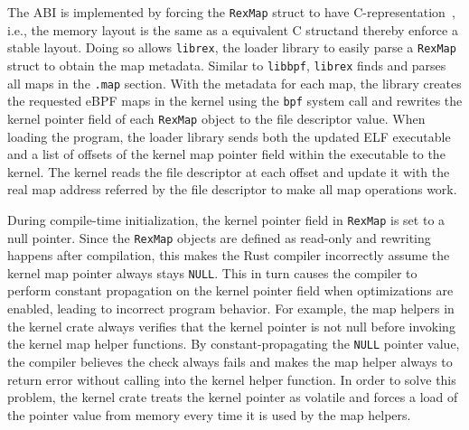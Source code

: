 The ABI is implemented by forcing the \texttt{RexMap} struct to have
    C-representation~\cite{nomicon-reprc}, i.e., the memory layout
    is the same as a equivalent C structand thereby enforce a stable layout.
Doing so allows \texttt{librex}, the \projname{} loader library to easily parse
    a \texttt{RexMap} struct to obtain the map metadata.
Similar to \texttt{libbpf}, \texttt{librex} finds and parses all maps in the
    \texttt{.map} section.
With the metadata for each map, the library creates the requested eBPF maps in
    the kernel using the \texttt{bpf} system call and rewrites the kernel
    pointer field of each \texttt{RexMap} object to the file descriptor value.
When loading the program, the loader library sends both the updated ELF
    executable and a list of offsets of the kernel map pointer field within the
    executable to the kernel.
The kernel reads the file descriptor at each offset and update it with the real
    map address referred by the file descriptor to make all map operations
    work.

During compile-time initialization, the kernel pointer field in
    \texttt{RexMap} is set to a null pointer.
Since the \texttt{RexMap} objects are defined as read-only and rewriting
    happens after compilation, this makes the Rust compiler incorrectly assume
    the kernel map pointer always stays \texttt{NULL}.
This in turn causes the compiler to perform constant propagation on the kernel
    pointer field when optimizations are enabled, leading to incorrect program
    behavior.
For example, the \projname{} map helpers in the \projname{} kernel crate always
    verifies that the kernel pointer is not null before invoking the kernel map
    helper functions.
By constant-propagating the \texttt{NULL} pointer value, the compiler believes
    the check always fails and makes the map helper always to return error
    without calling into the kernel helper function.
In order to solve this problem, the \projname{} kernel crate treats the kernel
    pointer as volatile and forces a load of the pointer value from memory
    every time it is used by the map helpers.


